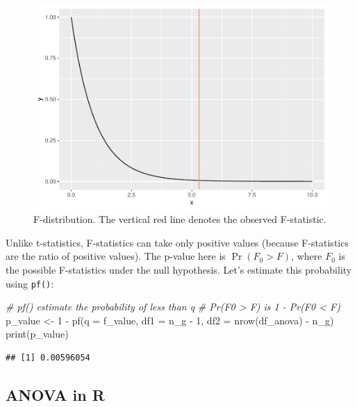 \documentclass[
]{article}
\newenvironment{Shaded}{\begin{snugshade}}{\end{snugshade}}
\newcommand{\AttributeTok}[1]{\textcolor[rgb]{0.77,0.63,0.00}{#1}}
\newcommand{\CommentTok}[1]{\textcolor[rgb]{0.56,0.35,0.01}{\textit{#1}}}
\newcommand{\DecValTok}[1]{\textcolor[rgb]{0.00,0.00,0.81}{#1}}
\newcommand{\FunctionTok}[1]{\textcolor[rgb]{0.00,0.00,0.00}{#1}}
\newcommand{\NormalTok}[1]{#1}
\newcommand{\OtherTok}[1]{\textcolor[rgb]{0.56,0.35,0.01}{#1}}
\newcommand{\SpecialCharTok}[1]{\textcolor[rgb]{0.00,0.00,0.00}{#1}}
\begin{document}
\begin{figure}

{\centering \includegraphics{biostats_files/figure-latex/f-dist-1} 

}

\caption{F-distribution. The vertical red line denotes the observed F-statistic.}\label{fig:f-dist}
\end{figure}

Unlike t-statistics, F-statistics can take only positive values (because F-statistics are the ratio of positive values). The p-value here is \(\Pr(F_0 > F)\), where \(F_0\) is the possible F-statistics under the null hypothesis. Let's estimate this probability using \texttt{pf()}:

\begin{Shaded}
\begin{Highlighting}[]
\CommentTok{\# pf() estimate the probability of less than q}
\CommentTok{\# Pr(F0 \textgreater{} F) is 1 {-} Pr(F0 \textless{} F)}
\NormalTok{p\_value }\OtherTok{\textless{}{-}} \DecValTok{1} \SpecialCharTok{{-}} \FunctionTok{pf}\NormalTok{(}\AttributeTok{q =}\NormalTok{ f\_value, }\AttributeTok{df1 =}\NormalTok{ n\_g }\SpecialCharTok{{-}} \DecValTok{1}\NormalTok{, }\AttributeTok{df2 =} \FunctionTok{nrow}\NormalTok{(df\_anova) }\SpecialCharTok{{-}}\NormalTok{ n\_g)}
\FunctionTok{print}\NormalTok{(p\_value)}
\end{Highlighting}
\end{Shaded}

\begin{verbatim}
## [1] 0.00596054
\end{verbatim}

\hypertarget{anova-in-r}{%
\subsection{ANOVA in R}\label{anova-in-r}}
\end{document}

